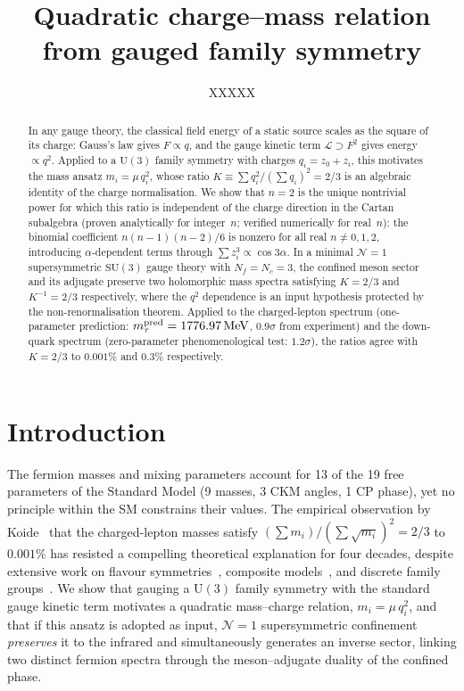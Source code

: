 \documentclass[preprint,12pt]{elsarticle}
\newcommand{\SU}{\mathrm{SU}}
\newcommand{\UU}{\mathrm{U}}
\newcommand{\Nf}{N_{\!f}}
\newcommand{\Nc}{N_{\!c}}
\newcommand{\MeV}{\,\mathrm{MeV}}
\begin{document}
\begin{frontmatter}

\title{Quadratic charge--mass relation from gauged family symmetry}

\author{XXXXX}
\address{XXXXX}

\begin{abstract}
In any gauge theory, the classical field energy of a static source
scales as the square of its charge:
Gauss's law gives $F \propto q$, and the gauge kinetic term
$\mathcal{L} \supset F^2$ gives energy~$\propto q^2$.
Applied to a $\UU(3)$ family symmetry with charges
$q_i = z_0 + z_i$, this motivates the mass ansatz
$m_i = \mu\,q_i^2$, whose ratio
$K \equiv \sum q_i^2/(\sum q_i)^2 = 2/3$
is an algebraic identity of the charge normalisation.
We show that $n = 2$ is the unique nontrivial power
for which this ratio is independent of the charge direction
in the Cartan subalgebra
(proven analytically for integer~$n$;
verified numerically for real~$n$): the binomial coefficient
$n(n{-}1)(n{-}2)/6$ is nonzero for all real $n \neq 0,1,2$,
introducing $\alpha$-dependent terms through
$\sum z_i^3 \propto \cos 3\alpha$.
In a minimal $\mathcal{N}=1$ supersymmetric $\SU(3)$ gauge theory
with $\Nf = \Nc = 3$, the confined meson sector and its adjugate
preserve two holomorphic mass spectra satisfying
$K = 2/3$ and $K^{-1} = 2/3$ respectively,
where the $q^2$ dependence is an input hypothesis
protected by the non-renormalisation theorem.
Applied to the charged-lepton spectrum
(one-parameter prediction:
$m_\tau^{\rm pred} = 1776.97\MeV$,
$0.9\sigma$ from experiment)
and the down-quark spectrum
(zero-parameter phenomenological test: $1.2\sigma$),
the ratios agree with $K = 2/3$
to $0.001\%$ and $0.3\%$ respectively.
\end{abstract}

\end{frontmatter}

\section{Introduction}
The fermion masses and mixing parameters account for
13 of the 19 free parameters of the Standard Model
(9 masses, 3 CKM angles, 1 CP phase),
yet no principle within the SM constrains their values.
The empirical observation by Koide~\cite{Koide:1983qe}
that the charged-lepton masses satisfy
$(\sum m_i)/(\sum\sqrt{m_i})^2 = 2/3$ to $0.001\%$
has resisted a compelling theoretical explanation
for four decades, despite extensive work on
flavour symmetries~\cite{FroggattNielsen:1979},
composite models~\cite{Rivero:2005},
and discrete family groups~\cite{Ma:2006}.
We show that gauging a $\UU(3)$ family symmetry with the
standard gauge kinetic term motivates a quadratic
mass--charge relation,
$m_i = \mu\,q_i^2$,
and that if this ansatz is adopted as input,
$\mathcal{N}{=}1$ supersymmetric confinement
\emph{preserves} it to the infrared and simultaneously
generates an inverse sector, linking two
distinct fermion spectra through
the meson--adjugate duality of the confined phase.
\end{document}
